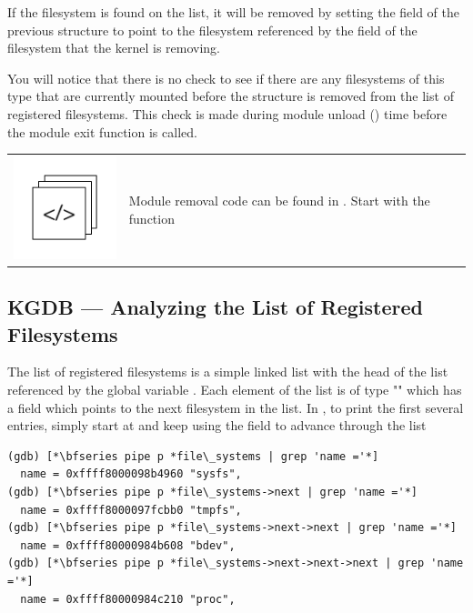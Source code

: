 \noindent
If the filesystem is found on the list, it will be removed by setting the  field of the previous structure to point to the filesystem referenced by the  field of the filesystem that the kernel is removing.

You will notice that there is no check to see if there are any filesystems of this type that are currently mounted before the  structure is removed from the list of registered filesystems. This check is made during module unload () time before the module exit function is called. 

\begin{table}[h]
\begin{tabular}{ll}
\parbox[l]{0.6in}{\includegraphics[scale=0.8]{figures/src-xref.pdf}} & \parbox[l]{4in}{\small{Module removal code can be found in . Start with the function }}
\end{tabular}
\end{table}


\subsection{KGDB --- Analyzing the List of Registered Filesystems}

The list of registered filesystems is a simple linked list with the head of the list referenced by the global variable . Each element of the list is of type "" which has a field  which points to the next filesystem in the list. In , to print the first several entries, simply start at  and keep using the  field to advance through the list

\begin{lstlisting}
(gdb) [*\bfseries pipe p *file\_systems | grep 'name ='*]
  name = 0xffff8000098b4960 "sysfs",
(gdb) [*\bfseries pipe p *file\_systems->next | grep 'name ='*]
  name = 0xffff8000097fcbb0 "tmpfs",
(gdb) [*\bfseries pipe p *file\_systems->next->next | grep 'name ='*]
  name = 0xffff80000984b608 "bdev",
(gdb) [*\bfseries pipe p *file\_systems->next->next->next | grep 'name ='*]
  name = 0xffff80000984c210 "proc",
\end{lstlisting}

